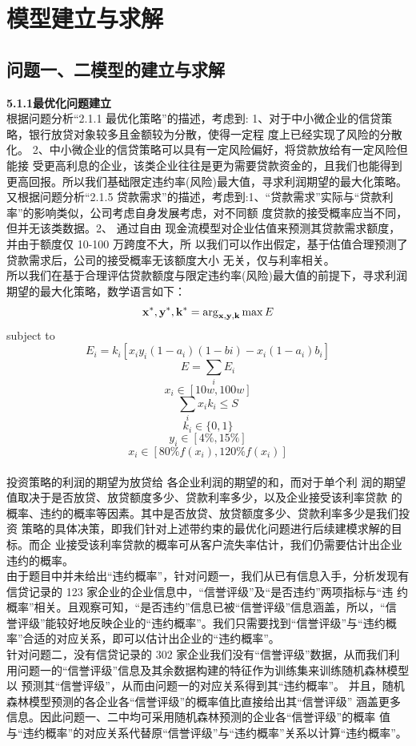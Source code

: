 \documentclass[bwprint]{cumcm}
\begin{document}
\newpage

\section{\heiti  模型建立与求解}



\subsection{\heiti 问题一、二模型的建立与求解}
\noindent \textbf{ 5.1.1最优化问题建立}\\
\indent 根据问题分析“2.1.1 最优化策略”的描述，考虑到: 1、对于中小微企业的信贷策略，银行放贷对象较多且金额较为分散，使得一定程
度上已经实现了风险的分散化。 2、中小微企业的信贷策略可以具有一定风险偏好，将贷款放给有一定风险但能接
受更高利息的企业，该类企业往往是更为需要贷款资金的，且我们也能得到更高回报。所以我们基础限定违约率(风险)最大值，寻求利润期望的最大化策略。
\\\indent 又根据问题分析“2.1.5 贷款需求”的描述，考虑到:1、“贷款需求”实际与“贷款利率”的影响类似，公司考虑自身发展考虑，对不同额
度贷款的接受概率应当不同，但并无该类数据。2、
通过自由 现金流模型对企业估值来预测其贷款需求额度，并由于额度仅 10-100 万跨度不大，所 以我们可以作出假定，基于估值合理预测了贷款需求后，公司的接受概率无该额度大小 无关，仅与利率相关。
\\\indent 所以我们在基于合理评估贷款额度与限定违约率(风险)最大值的前提下，寻求利润期望的最大化策略，数学语言如下：
\begin{displaymath}
\bold{x}^*, \bold{y}^*,\bold{k}^* =\arg_{\bold{x}, \bold{y},\bold{k} }\max E \\
\end{displaymath}
subject to
$$ E_i =k_i[x_i y_i (1-a_i)(1-bi)-x_i(1-a_i)b_i]$$
$$ E=\sum_i E_i$$
$$x_i \in [10w, 100w]$$
$$\sum_i x_i k_i\leq S$$
$$k_i\in\{0,1\}$$
$$y_i \in [4\%,15\%]$$
$$x_i\in [80\% f(x_i),120\% f(x_i)]$$\\
\indent 投资策略的利润的期望为放贷给 各企业利润的期望的和，而对于单个利
润的期望值取决于是否放贷、放贷额度多少、贷款利率多少，以及企业接受该利率贷款 的概率、违约的概率等因素。其中是否放贷、放贷额度多少、贷款利率多少是我们投资 策略的具体决策，即我们针对上述带约束的最优化问题进行后续建模求解的目标。而企 业接受该利率贷款的概率可从客户流失率估计，我们仍需要估计出企业违约的概率。\\
\indent 由于题目中并未给出“违约概率”，针对问题一，我们从已有信息入手，分析发现有信贷记录的 123 家企业的企业信息中，“信誉评级”及“是否违约”两项指标与“违 约概率”相关。且观察可知，“是否违约”信息已被“信誉评级”信息涵盖，所以，“信 誉评级”能较好地反映企业的“违约概率”。我们只需要找到“信誉评级”与“违约概 率”合适的对应关系，即可以估计出企业的“违约概率”。\\
\indent 针对问题二，没有信贷记录的 302 家企业我们没有“信誉评级”数据，从而我们利
用问题一的“信誉评级”信息及其余数据构建的特征作为训练集来训练随机森林模型以
预测其“信誉评级”，从而由问题一的对应关系得到其“违约概率”。 并且，随机森林模型预测的各企业各“信誉评级”的概率值比直接给出其“信誉评级”
涵盖更多信息。因此问题一、二中均可采用随机森林预测的企业各“信誉评级”的概率 值与“违约概率”的对应关系代替原“信誉评级”与“违约概率”关系以计算“违约概率”。
\end{document}
